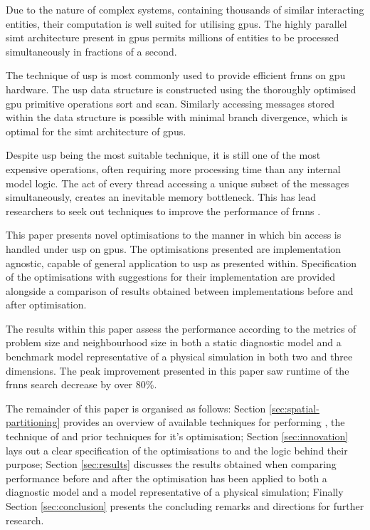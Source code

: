   Due to the nature of complex systems, containing thousands of similar interacting entities, their computation is well suited for utilising \glspl{gpu}. The highly parallel \gls{simt} architecture present in \glspl{gpu} permits millions of entities to be processed simultaneously in fractions of a second. 
  
  The technique of \gls{usp} is most commonly used to provide efficient \gls{frnns} on \gls{gpu} hardware. The \gls{usp} data structure is constructed using the thoroughly optimised \gls{gpu} primitive operations sort and scan. Similarly accessing messages stored within the data structure is possible with minimal branch divergence, which is optimal for the \gls{simt} architecture of \glspl{gpu}.
  
  Despite \gls{usp} being the most suitable technique, it is still one of the most expensive operations, often requiring more processing time than any internal model logic. The act of every thread accessing a unique subset of the messages simultaneously, creates an inevitable memory bottleneck. This has lead researchers to seek out techniques to improve the performance of \gls{frnns} \cite{GS*10,Hoe14,HY*15}.
  
  This paper presents novel optimisations to the manner in which bin access is handled under \gls{usp} on \glspl{gpu}. The optimisations presented are implementation agnostic, capable of general application to \gls{usp} as presented within. Specification of the optimisations with suggestions for their implementation are provided alongside a comparison of results obtained between implementations before and after optimisation. 
  
  The results within this paper assess the performance according to the metrics of problem size and neighbourhood size in both a static diagnostic model and a benchmark model representative of a physical simulation in both two and three dimensions. The peak improvement presented in this paper saw runtime of the \gls{frnns} search decrease by over 80\%.
  
  The remainder of this paper is organised as follows: Section \ref{sec:spatial-partitioning} provides an overview of available techniques for performing , the technique of  and prior techniques for it's optimisation; Section \ref{sec:innovation} lays out a clear specification of the optimisations to  and the logic behind their purpose; Section \ref{sec:results} discusses the results obtained when comparing performance before and after the optimisation has been applied to both a diagnostic model and a model representative of a physical simulation; Finally Section \ref{sec:conclusion} presents the concluding remarks and directions for further research.
  
  

